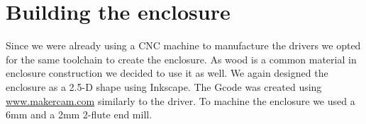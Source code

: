 \documentclass{article}
\begin{document}
%

\section{Building the enclosure}
\label{s:enclosure}

Since we were already using a CNC machine to manufacture the drivers we opted for the same toolchain to create the enclosure. As wood is a common material in enclosure construction we decided to use it as well. We again designed the enclosure as a 2.5-D shape using Inkscape. The Gcode was created using \url{www.makercam.com} similarly to the driver. To machine the enclosure we used a 6mm and a 2mm 2-flute end mill.
\end{document}

